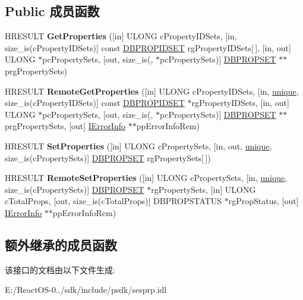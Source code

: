 \subsection*{Public 成员函数}
\begin{DoxyCompactItemize}
\item 
\mbox{\label{interface_i_session_properties_a3f8207d5ad3953085ff552dd3ca8348f}} 
H\+R\+E\+S\+U\+LT {\bfseries Get\+Properties} (\mbox{[}in\mbox{]} U\+L\+O\+NG c\+Property\+I\+D\+Sets, \mbox{[}in, size\+\_\+is(c\+Property\+I\+D\+Sets)\mbox{]} const \hyperlink{structtag_d_b_p_r_o_p_i_d_s_e_t}{D\+B\+P\+R\+O\+P\+I\+D\+S\+ET} rg\+Property\+I\+D\+Sets\mbox{[}$\,$\mbox{]}, \mbox{[}in, out\mbox{]} U\+L\+O\+NG $\ast$pc\+Property\+Sets, \mbox{[}out, size\+\_\+is(, $\ast$pc\+Property\+Sets)\mbox{]} \hyperlink{structtag_d_b_p_r_o_p_s_e_t}{D\+B\+P\+R\+O\+P\+S\+ET} $\ast$$\ast$prg\+Property\+Sets)
\item 
\mbox{\label{interface_i_session_properties_a1434fe6b3b904674cc3ff01ff6a66369}} 
H\+R\+E\+S\+U\+LT {\bfseries Remote\+Get\+Properties} (\mbox{[}in\mbox{]} U\+L\+O\+NG c\+Property\+I\+D\+Sets, \mbox{[}in, \hyperlink{interfaceunique}{unique}, size\+\_\+is(c\+Property\+I\+D\+Sets)\mbox{]} const \hyperlink{structtag_d_b_p_r_o_p_i_d_s_e_t}{D\+B\+P\+R\+O\+P\+I\+D\+S\+ET} $\ast$rg\+Property\+I\+D\+Sets, \mbox{[}in, out\mbox{]} U\+L\+O\+NG $\ast$pc\+Property\+Sets, \mbox{[}out, size\+\_\+is(, $\ast$pc\+Property\+Sets)\mbox{]} \hyperlink{structtag_d_b_p_r_o_p_s_e_t}{D\+B\+P\+R\+O\+P\+S\+ET} $\ast$$\ast$prg\+Property\+Sets, \mbox{[}out\mbox{]} \hyperlink{interface_i_error_info}{I\+Error\+Info} $\ast$$\ast$pp\+Error\+Info\+Rem)
\item 
\mbox{\label{interface_i_session_properties_ae24fca80c34982fd9efc12d8c749c0dc}} 
H\+R\+E\+S\+U\+LT {\bfseries Set\+Properties} (\mbox{[}in\mbox{]} U\+L\+O\+NG c\+Property\+Sets, \mbox{[}in, out, \hyperlink{interfaceunique}{unique}, size\+\_\+is(c\+Property\+Sets)\mbox{]} \hyperlink{structtag_d_b_p_r_o_p_s_e_t}{D\+B\+P\+R\+O\+P\+S\+ET} rg\+Property\+Sets\mbox{[}$\,$\mbox{]})
\item 
\mbox{\label{interface_i_session_properties_ae4c46144fde55754a11c9646b2347f05}} 
H\+R\+E\+S\+U\+LT {\bfseries Remote\+Set\+Properties} (\mbox{[}in\mbox{]} U\+L\+O\+NG c\+Property\+Sets, \mbox{[}in, \hyperlink{interfaceunique}{unique}, size\+\_\+is(c\+Property\+Sets)\mbox{]} \hyperlink{structtag_d_b_p_r_o_p_s_e_t}{D\+B\+P\+R\+O\+P\+S\+ET} $\ast$rg\+Property\+Sets, \mbox{[}in\mbox{]} U\+L\+O\+NG c\+Total\+Props, \mbox{[}out, size\+\_\+is(c\+Total\+Props)\mbox{]} D\+B\+P\+R\+O\+P\+S\+T\+A\+T\+US $\ast$rg\+Prop\+Status, \mbox{[}out\mbox{]} \hyperlink{interface_i_error_info}{I\+Error\+Info} $\ast$$\ast$pp\+Error\+Info\+Rem)
\end{DoxyCompactItemize}
\subsection*{额外继承的成员函数}


该接口的文档由以下文件生成\+:\begin{DoxyCompactItemize}
\item 
E\+:/\+React\+O\+S-\/0../sdk/include/psdk/sesprp.\+idl\end{DoxyCompactItemize}
